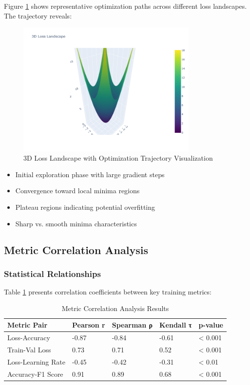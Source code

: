 \documentclass[12pt,a4paper]{article}
\begin{document}
Figure \ref{fig:optimization-trajectory} shows representative optimization paths across different loss landscapes. The trajectory reveals:

\begin{figure}[H]
\centering
\includegraphics[width=0.8\textwidth]{papers/figures/loss_landscape_3d.png}
\caption{3D Loss Landscape with Optimization Trajectory Visualization}
\label{fig:optimization-trajectory}
\end{figure}

\begin{itemize}
    \item Initial exploration phase with large gradient steps
    \item Convergence toward local minima regions
    \item Plateau regions indicating potential overfitting
    \item Sharp vs. smooth minima characteristics
\end{itemize}

\subsection{Metric Correlation Analysis}

\subsubsection{Statistical Relationships}

Table \ref{tab:correlation-analysis} presents correlation coefficients between key training metrics:

\begin{table}[H]
\centering
\caption{Metric Correlation Analysis Results}
\label{tab:correlation-analysis}
\begin{tabular}{@{}lllll@{}}
\toprule
Metric Pair & Pearson r & Spearman ρ & Kendall τ & p-value \\
\midrule
Loss-Accuracy & -0.87 & -0.84 & -0.61 & < 0.001 \\
Train-Val Loss & 0.73 & 0.71 & 0.52 & < 0.001 \\
Loss-Learning Rate & -0.45 & -0.42 & -0.31 & < 0.01 \\
Accuracy-F1 Score & 0.91 & 0.89 & 0.68 & < 0.001 \\
\bottomrule
\end{tabular}
\end{table}
\end{document}

